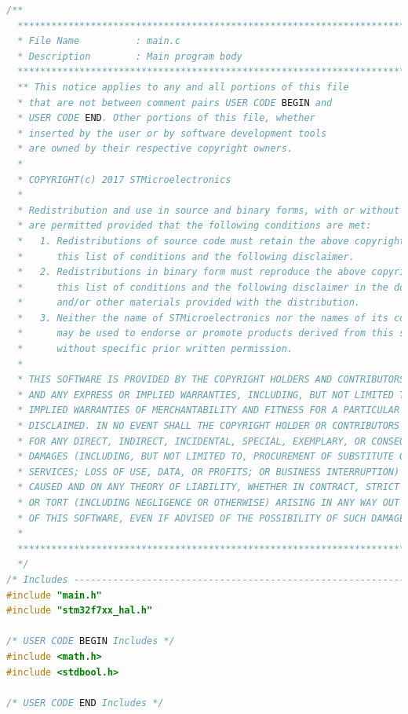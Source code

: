 \begin{lstlisting}[language = c]
/**
  ******************************************************************************
  * File Name          : main.c
  * Description        : Main program body
  ******************************************************************************
  ** This notice applies to any and all portions of this file
  * that are not between comment pairs USER CODE BEGIN and
  * USER CODE END. Other portions of this file, whether 
  * inserted by the user or by software development tools
  * are owned by their respective copyright owners.
  *
  * COPYRIGHT(c) 2017 STMicroelectronics
  *
  * Redistribution and use in source and binary forms, with or without modification,
  * are permitted provided that the following conditions are met:
  *   1. Redistributions of source code must retain the above copyright notice,
  *      this list of conditions and the following disclaimer.
  *   2. Redistributions in binary form must reproduce the above copyright notice,
  *      this list of conditions and the following disclaimer in the documentation
  *      and/or other materials provided with the distribution.
  *   3. Neither the name of STMicroelectronics nor the names of its contributors
  *      may be used to endorse or promote products derived from this software
  *      without specific prior written permission.
  *
  * THIS SOFTWARE IS PROVIDED BY THE COPYRIGHT HOLDERS AND CONTRIBUTORS "AS IS"
  * AND ANY EXPRESS OR IMPLIED WARRANTIES, INCLUDING, BUT NOT LIMITED TO, THE
  * IMPLIED WARRANTIES OF MERCHANTABILITY AND FITNESS FOR A PARTICULAR PURPOSE ARE
  * DISCLAIMED. IN NO EVENT SHALL THE COPYRIGHT HOLDER OR CONTRIBUTORS BE LIABLE
  * FOR ANY DIRECT, INDIRECT, INCIDENTAL, SPECIAL, EXEMPLARY, OR CONSEQUENTIAL
  * DAMAGES (INCLUDING, BUT NOT LIMITED TO, PROCUREMENT OF SUBSTITUTE GOODS OR
  * SERVICES; LOSS OF USE, DATA, OR PROFITS; OR BUSINESS INTERRUPTION) HOWEVER
  * CAUSED AND ON ANY THEORY OF LIABILITY, WHETHER IN CONTRACT, STRICT LIABILITY,
  * OR TORT (INCLUDING NEGLIGENCE OR OTHERWISE) ARISING IN ANY WAY OUT OF THE USE
  * OF THIS SOFTWARE, EVEN IF ADVISED OF THE POSSIBILITY OF SUCH DAMAGE.
  *
  ******************************************************************************
  */
/* Includes ------------------------------------------------------------------*/
#include "main.h"
#include "stm32f7xx_hal.h"

/* USER CODE BEGIN Includes */
#include <math.h>
#include <stdbool.h>

/* USER CODE END Includes */


\end{lstlisting}

